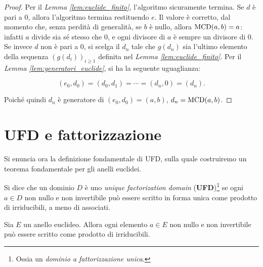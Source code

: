 \documentclass[11pt]{scrbook}
\begin{document}
\begin{proof}
    Per il \textit{Lemma \ref{lem:euclide_finito}}, l'algoritmo sicuramente termina.
    Se $d$ è pari a $0$, allora l'algoritmo termina restituendo $e$. Il valore è
    corretto, dal momento che, senza perdità di generalità, se $b$ è nullo, allora
    $\operatorname{MCD}(a, b)=a$: infatti $a$ divide sia sé stesso che $0$, e ogni divisore di $a$ è
    sempre un divisore di $0$. \\

    Se invece $d$ non è pari a $0$, si scelga il $d_n$ tale che $g(d_n)$ sia l'ultimo
    elemento della sequenza $(g(d_i))_{i\geq1}$ definita nel \textit{Lemma \ref{lem:euclide_finito}}. Per il \textit{Lemma \ref{lem:generatori_euclide}},
    si ha la seguente uguaglianza:

    \[ (e_0, d_0) = (d_0, d_1) = \cdots = (d_n, 0) = (d_n). \]

    \vskip 0.1in

    Poiché quindi $d_n$ è generatore di $(e_0, d_0)=(a,b)$, $d_n = \operatorname{MCD}(a,b)$.
\end{proof}

\section{UFD e fattorizzazione}

Si enuncia ora la definizione fondamentale di UFD, sulla
quale costruiremo un teorema fondamentale per gli anelli
euclidei.

\begin{definition}
    Si dice che un dominio $D$ è uno \textit{unique factorization domain} (\textbf{UFD})\footnote{Ossia
        un \textit{dominio a fattorizzazione unica}.} se ogni $a \in D$ non nullo e non invertibile può essere scritto
    in forma unica come prodotto di irriducibili, a meno di associati.
\end{definition}

\begin{lemma}
    \label{lem:fattorizzazione}
    Sia $E$ un anello euclideo. Allora ogni elemento $a \in E$ non nullo e
    non invertibile può essere scritto come prodotto di irriducibili.
\end{lemma}
\end{document}
